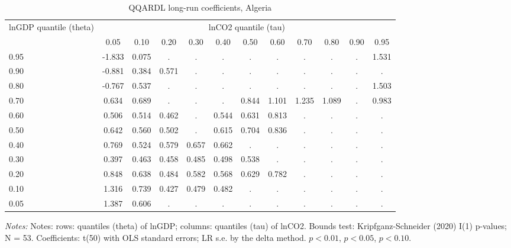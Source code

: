 \begin{table}[htbp]\centering
\caption{QQARDL long-run coefficients, Algeria}\label{tab:qqardl}
\small
\begin{tabular}{lccccccccccc}
\toprule
lnGDP quantile (theta) & \multicolumn{11}{c}{lnCO2 quantile (tau)} \\
\cmidrule(lr){2-12}
 & 0.05 & 0.10 & 0.20 & 0.30 & 0.40 & 0.50 & 0.60 & 0.70 & 0.80 & 0.90 & 0.95 \\
\midrule
0.95 & -1.833 & 0.075 & . & . & . & . & . & . & . & . & 1.531\sym{***} \\
0.90 & -0.881 & 0.384 & 0.571\sym{*} & . & . & . & . & . & . & . & . \\
0.80 & -0.767 & 0.537 & . & . & . & . & . & . & . & . & 1.503\sym{***} \\
0.70 & 0.634 & 0.689\sym{**} & . & . & . & 0.844\sym{***} & 1.101\sym{***} & 1.235\sym{***} & 1.089\sym{***} & . & 0.983\sym{***} \\
0.60 & 0.506 & 0.514\sym{*} & 0.462\sym{***} & . & 0.544\sym{***} & 0.631\sym{***} & 0.813\sym{***} & . & . & . & . \\
0.50 & 0.642 & 0.560\sym{**} & 0.502\sym{***} & . & 0.615\sym{***} & 0.704\sym{***} & 0.836\sym{***} & . & . & . & . \\
0.40 & 0.769 & 0.524\sym{*} & 0.579\sym{***} & 0.657\sym{***} & 0.662\sym{***} & . & . & . & . & . & . \\
0.30 & 0.397 & 0.463\sym{*} & 0.458\sym{***} & 0.485\sym{***} & 0.498\sym{***} & 0.538\sym{**} & . & . & . & . & . \\
0.20 & 0.848 & 0.638\sym{**} & 0.484\sym{***} & 0.582\sym{***} & 0.568\sym{***} & 0.629\sym{***} & 0.782\sym{***} & . & . & . & . \\
0.10 & 1.316\sym{*} & 0.739\sym{***} & 0.427\sym{***} & 0.479\sym{**} & 0.482\sym{**} & . & . & . & . & . & . \\
0.05 & 1.387\sym{***} & 0.606\sym{***} & . & . & . & . & . & . & . & . & . \\
\bottomrule
\end{tabular}
\par\smallskip\begin{minipage}{0.95\linewidth}\footnotesize\textit{Notes:} Notes: rows: quantiles (theta) of lnGDP; columns: quantiles (tau) of lnCO2. Bounds test: Kripfganz-Schneider (2020) I(1) p-values; N = 53. Coefficients: t(50) with OLS standard errors; LR s.e. by the delta method. \sym{***} $p<0.01$, \sym{**} $p<0.05$, \sym{*} $p<0.10$.\end{minipage}
\end{table}